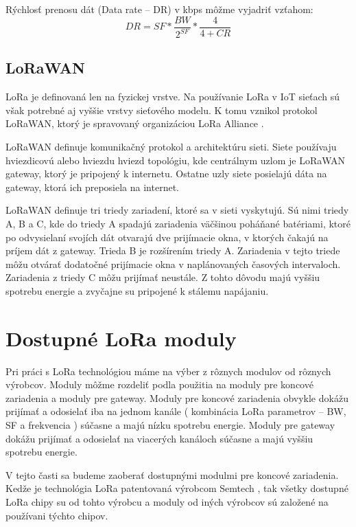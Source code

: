 \documentclass[slovak,master]{diploma}
\begin{document}
Rýchlosť prenosu dát (Data rate -- DR) v kbps môžme vyjadriť vzťahom:
\begin{equation}
  DR = SF * \frac{BW}{2^{SF}} * \frac{4}{4+CR}
\end{equation}

\section{LoRaWAN}
LoRa je definovaná len na fyzickej vrstve. Na používanie LoRa v IoT sieťach sú však potrebné aj vyššie vrstvy sieťového modelu.
K tomu vznikol protokol LoRaWAN, ktorý je spravovaný organizáciou LoRa Alliance \cite{lora}.

LoRaWAN definuje komunikačný protokol a architektúru sieti. Siete používaju hviezdicovú alebo hviezdu hviezd topológiu, kde 
centrálnym uzlom je LoRaWAN gateway, ktorý je pripojený k internetu. Ostatne uzly siete posielajú dáta na gateway, ktorá ich preposiela na internet.

LoRaWAN definuje tri triedy zariadení, ktoré sa v sieti vyskytujú. Sú nimi triedy A, B a C, kde do triedy A spadajú zariadenia 
väčšinou poháňané batériami, ktoré po odvysielaní svojích dát otvarajú dve prijímacie okna, v ktorých čakajú na príjem dát z gateway.
Trieda B je rozšírením triedy A. Zariadenia v tejto triede môžu otvárať dodatočné prijímacie okna v naplánovaných časových intervaloch.
Zariadenia z triedy C môžu prijímať neustále. Z tohto dôvodu majú vyššiu spotrebu energie a zvyčajne su pripojené k stálemu napájaniu.

\chapter{Dostupné LoRa moduly }
Pri práci s LoRa technológiou máme na výber z rôznych modulov od rôznych výrobcov.
Moduly môžme rozdeliť podla použitia na moduly pre koncové zariadenia a moduly pre gateway.
Moduly pre koncové zariadenia obvykle dokážu prijímať a odosielať iba na jednom kanále ( kombinácia LoRa parametrov --  BW, SF a frekvencia ) súčasne a majú 
nízku spotrebu energie. Moduly pre gateway dokážu prijímať a odosielať na viacerých kanáloch súčasne a majú vyššiu spotrebu energie.

V tejto časti sa budeme zaoberať dostupnými modulmi pre koncové zariadenia.
Kedže je technológia LoRa patentovaná výrobcom Semtech \cite{semtech}, tak všetky dostupné LoRa chipy su od tohto výrobcu a moduly od iných výrobcov 
sú založené na používani týchto chipov.
\end{document}
